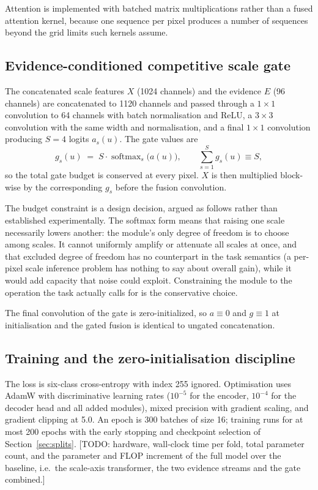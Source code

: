 \documentclass[preprint,12pt,authoryear]{elsarticle}
\begin{document}
Attention is implemented with batched matrix multiplications rather than a fused
attention kernel, because one sequence per pixel produces a number of sequences
beyond the grid limits such kernels assume.

\subsection{Evidence-conditioned competitive scale gate}
\label{sec:gate}

The concatenated scale features $X$ (1024 channels) and the evidence $E$ (96
channels) are concatenated to 1120 channels and passed through a $1\times1$
convolution to 64 channels with batch normalisation and ReLU, a $3\times3$
convolution with the same width and normalisation, and a final $1\times1$
convolution producing $S=4$ logits $a_s(u)$. The gate values are
\begin{equation}
g_s(u) \;=\; S \cdot \operatorname{softmax}_s\bigl(a(u)\bigr),
\qquad \sum_{s=1}^{S} g_s(u) \equiv S ,
\label{eq:gate}
\end{equation}
so the total gate budget is conserved at every pixel. $X$ is then multiplied
block-wise by the corresponding $g_s$ before the fusion convolution.

The budget constraint is a design decision, argued as follows rather than
established experimentally. The softmax form means that raising one scale
necessarily lowers another: the module's only degree of freedom is to
choose among scales. It cannot uniformly amplify or attenuate all scales
at once, and that excluded degree of freedom has no counterpart in the task
semantics (a per-pixel scale inference problem has nothing to say about
overall gain), while it would add capacity that noise could exploit.
Constraining the module to the operation the task actually calls for is the
conservative choice.

The final convolution of the gate is zero-initialized, so $a \equiv 0$ and
$g \equiv 1$ at initialisation and the gated fusion is identical to ungated
concatenation.

\subsection{Training and the zero-initialisation discipline}
\label{sec:training}

The loss is six-class cross-entropy with index 255 ignored. Optimisation uses
AdamW \citep{loshchilov2019adamw} with discriminative learning rates
($10^{-5}$ for the encoder, $10^{-4}$ for the decoder head and all added
modules), mixed precision with gradient scaling, and gradient clipping at 5.0. An
epoch is 300 batches of size 16; training runs for at most 200 epochs with the
early stopping and checkpoint selection of Section~\ref{sec:splits}.
[TODO: hardware, wall-clock time per fold, total parameter count, and the
parameter and FLOP increment of the full model over the baseline, i.e.\ the
scale-axis transformer, the two evidence streams and the gate combined.]
\end{document}
